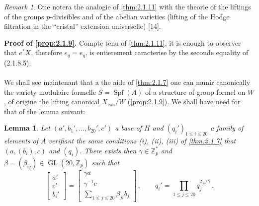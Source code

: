 \documentclass[12pt,a4paper]{article}
\theoremstyle{plain}
\newtheorem{lemma}[theorem]{Lemma}
\theoremstyle{definition}
\theoremstyle{remark}
\newtheorem{remark}[theorem]{Remark}
\DeclareMathOperator{\Spf}{Spf}
\DeclareMathOperator{\GL}{GL}
\begin{document}
\begin{remark}\label{rem:2.1.12}
One notera the analogie of \ref{thm:2.1.11} with the theorie of the liftings of the groups $p$-divisibles and of the abelian varieties (lifting of the Hodge filtration in the ``cristal'' extension universelle) [14].
\end{remark}

\textbf{Proof of \ref{prop:2.1.9}.} Compte tenu of \ref{thm:2.1.11}, it is enough to observer that $e^*X$, therefore $e_q = e_q$, is entierement caracterise by the seconde equality of (2.1.8.5).

\paragraph{}

We shall see maintenant that a the aide of \ref{thm:2.1.7} one can munir canonically the variety modulaire formelle $S = \Spf(A)$ of a structure of group formel on $W$, of origine the lifting canonical $X_{\mathrm{can}}/W$ (\ref{prop:2.1.9}). We shall have need for that of the lemma suivant:

\begin{lemma}\label{lem:2.1.13}
Let $(a', b_1', \ldots, b_{20}', c')$ a base of $H$ and $(q_i')_{1 \leq i \leq 20}$ a family of elements of $A$ verifiant the same conditions (i), (ii), (iii) of \ref{thm:2.1.7} that $(a, (b_i), c)$ and $(q_i)$. There exists then $\gamma \in \mathbb{Z}_p^*$ and $\beta = (\beta_{ij}) \in \GL(20, \mathbb{Z}_p)$ such that
\begin{equation}\label{eq:2.1.13.1}
\begin{bmatrix} a' \\ c' \\ b_i' \end{bmatrix} = \begin{bmatrix} \gamma a \\ \gamma^{-1}c \\ \sum_{1 \leq j \leq 20} \beta_{ji} b_j \end{bmatrix}\,, \qquad q_i' = \prod_{1 \leq j \leq 20} q_j^{\beta_{ji}/\gamma}\,.\end{equation}
\end{lemma}
\end{document}
